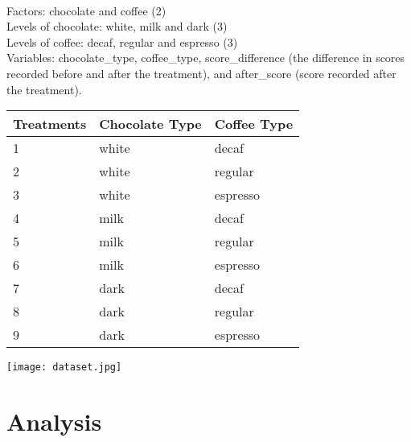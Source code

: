 \documentclass[12pt]{article}
\begin{document}
\begin{flushleft}
\bigskip
\bigskip
\\ Factors: chocolate and coffee (2)
\\ Levels of chocolate: white, milk and dark (3)
\\ Levels of coffee: decaf, regular and espresso (3)
\\ Variables: chocolate\_type, coffee\_type, score\_difference (the difference in scores recorded before and after the treatment), and after\_score (score recorded after the treatment). 
\begin{tabular}{ |p{3cm}|p{3cm}|p{3cm}| }
 \hline
 Treatments & Chocolate Type & Coffee Type\\
 \hline
 1 & white & decaf \\
 2 & white  & regular \\
 3 & white  & espresso \\
 4 & milk & decaf \\
 5 & milk & regular \\
 6 & milk & espresso \\
 7 & dark & decaf \\
 8 & dark  & regular \\
 9 & dark & espresso \\
 \hline
\end{tabular}
\begin{center}
\texttt{[image: dataset.jpg]}
\end{center}
\section{Analysis}
\bigskip

\end{flushleft}
\end{document}

